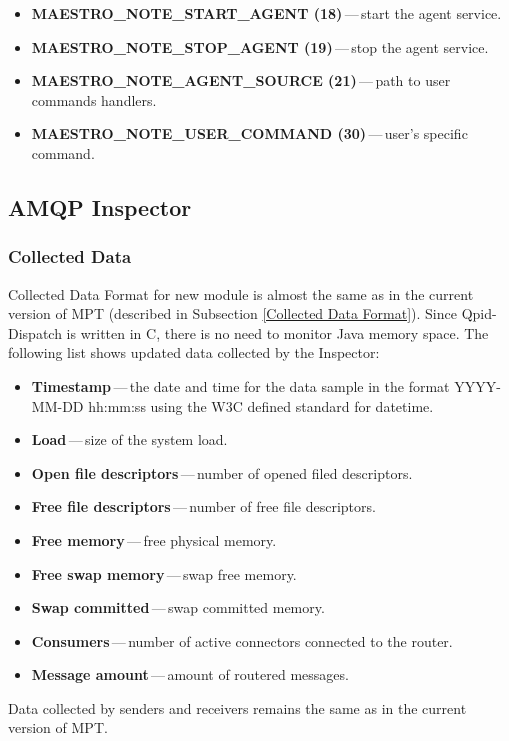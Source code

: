 \begin{itemize}
	\setlength\itemsep{0em}
	\item \textbf{MAESTRO\_NOTE\_START\_AGENT (18)}\,---\,start the agent service.
	\item \textbf{MAESTRO\_NOTE\_STOP\_AGENT (19)}\,---\,stop the agent service.
	\item \textbf{MAESTRO\_NOTE\_AGENT\_SOURCE (21)}\,---\,path to user commands handlers.
	\item \textbf{MAESTRO\_NOTE\_USER\_COMMAND (30)}\,---\,user's specific command.
\end{itemize}

\subsection{AMQP Inspector}
\label{AMQP Inspector}

\subsubsection*{Collected Data}
\label{Collected Data}
Collected Data Format for new module is almost the same as in the current version of MPT (described in Subsection \ref{Collected Data Format}). Since Qpid-Dispatch is written in C, there is no need to monitor Java memory space. The following list shows updated data collected by the Inspector:

\begin{itemize}
	\setlength\itemsep{0em}
	\item \textbf{Timestamp}\,---\,the date and time for the data sample in the format YYYY-MM-DD hh:mm:ss using the W3C defined standard for datetime.
	\item \textbf{Load}\,---\,size of the system load.
	\item \textbf{Open file descriptors}\,---\,number of opened filed descriptors.
	\item \textbf{Free file descriptors}\,---\,number of free file descriptors.
	\item \textbf{Free memory}\,---\,free physical memory.
	\item \textbf{Free swap memory}\,---\,swap free memory.
	\item \textbf{Swap committed}\,---\,swap committed memory.
	\item \textbf{Consumers}\,---\,number of active connectors connected to the router.
	\item \textbf{Message amount}\,---\,amount of routered messages.
\end{itemize}
Data collected by senders and receivers remains the same as in the current version of MPT.


